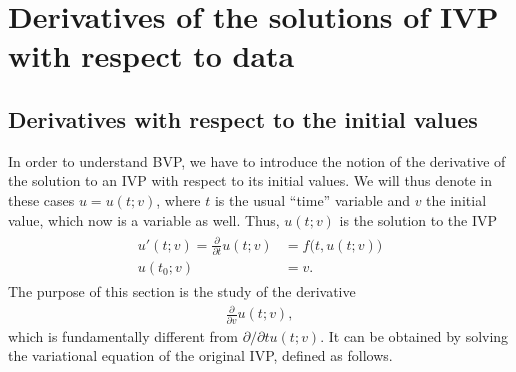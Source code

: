\section{Derivatives of the solutions of IVP with respect to data}
\subsection{Derivatives with respect to the initial values}
\begin{intro}
  In order to understand BVP, we have to introduce the notion of the
  derivative of the solution to an IVP with respect to its initial
  values. We will thus denote in these cases $u=u(t;v)$, where $t$ is
  the usual ``time'' variable and $v$ the initial value, which now is
  a variable as well. Thus, $u(t;v)$ is the solution to the IVP
  \begin{gather}
    \label{eq:derivatives:1}
    \begin{split}
      u'(t;v) = \tfrac{\partial}{\partial t} u(t;v) &= f\bigl(t,u(t;v)\bigr) \\
      u(t_0;v) &= v.
    \end{split}
  \end{gather}
  The purpose of this section is the study of the derivative
  \begin{gather*}
    \tfrac{\partial}{\partial v} u(t;v),
  \end{gather*}
  which is fundamentally different from $\partial/\partial t
  u(t;v)$.
  It can be obtained by solving the variational equation of the
  original IVP, defined as follows.
\end{intro}

